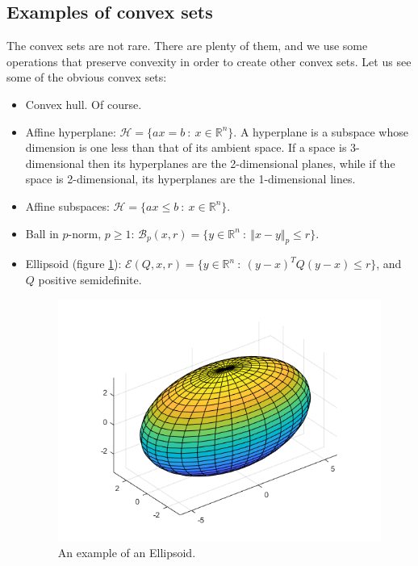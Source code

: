 \subsection{Examples of convex sets}
\par The convex sets are not rare. There are plenty of them, and we use some operations that preserve convexity in order to create other convex sets. Let us see some of the obvious convex sets:
\begin{itemize}
    \item Convex hull. Of course.
    \item Affine hyperplane: $\mathcal{H} = \{ax = b\ :\ x \in \mathbb{R}^n\}$. A hyperplane is a subspace whose dimension is one less than that of its ambient space. If a space is 3-dimensional then its hyperplanes are the 2-dimensional planes, while if the space is 2-dimensional, its hyperplanes are the 1-dimensional lines.
    \item Affine subspaces: $\mathcal{H} = \{ax \leq b\ :\ x \in \mathbb{R}^n\}$.
    \item Ball in $p$-norm, $p \geq 1$: $\mathcal{B}_p(x,r) = \{y \in \mathbb{R}^n\ :\ \Vert x-y \Vert_p \leq r\}$.
    \item Ellipsoid (figure \ref{fig:chapter2-ellipsoid}): $\mathcal{E}(Q,x,r) = \{y \in \mathbb{R}^n\ :\ (y-x)^T Q (y-x) \leq r\}$, and $Q$ positive semidefinite.
    \begin{figure}
        \centering
        \includegraphics[scale=0.4]{figures/2/chapter2-ellipsoid.png}
        \caption{An example of an Ellipsoid.}
        \label{fig:chapter2-ellipsoid}
    \end{figure}

\end{itemize}
